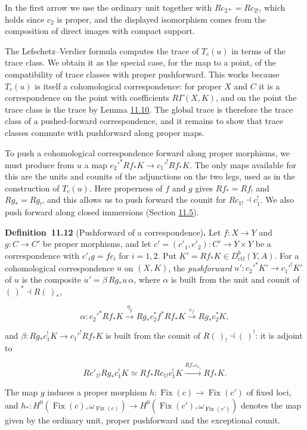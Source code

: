 \documentclass[11pt]{article}
\newenvironment{bpstatement}[2]{\par\addvspace{0.6\baselineskip}\noindent\textbf{#1}#2\textbf{.}\enspace\ignorespaces}
  {\par\addvspace{0.4\baselineskip}}
\providecommand{\Fix}{}\renewcommand{\Fix}{\operatorname{Fix}}
\begin{document}
\label{bp203}%
In the first arrow we use the ordinary unit together with \(Rc_{2*}=Rc_{2!}\), which holds since \(c_2\) is proper, and the displayed isomorphism comes from the composition of direct images with compact support.

The Lefschetz–Verdier formula computes the trace of \(T_c(u)\) in terms of the trace class. We obtain it as the special case, for the map to a point, of the compatibility of trace classes with proper pushforward. This works because \(T_c(u)\) is itself a cohomological correspondence: for proper \(X\) and \(C\) it is a correspondence on the point with coefficients \(R\Gamma(X,K)\), and on the point the trace class is the trace by Lemma \hyperref[bp199]{11.10}. The global trace is therefore the trace class of a pushed-forward correspondence, and it remains to show that trace classes commute with pushforward along proper maps.

To push a cohomological correspondence forward along proper morphisms, we must produce from \(u\) a map \(c_2'^*Rf_*K\to c_1'^!Rf_*K\). The only maps available for this are the units and counits of the adjunctions on the two legs, used as in the construction of \(T_c(u)\). Here properness of \(f\) and \(g\) gives \(Rf_*=Rf_!\) and \(Rg_*=Rg_!\), and this allows us to push forward the counit for \(Rc_{1!}\dashv c_1^!\). We also push forward along closed immersions (Section \hyperref[bp209]{11.5}).

\label{bp204}%
\begin{bpstatement}{Definition~11.12}{ (Pushforward of a correspondence)}
Let \(f:X\to Y\) and \(g:C\to C'\) be proper morphisms, and let \(c'=(c'_1,c'_2):C'\to Y\times Y\) be a correspondence with \(c'_ig=fc_i\) for \(i=1,2\). Put \(K'=Rf_*K\in D^b_{\mathrm{ctf}}(Y,A)\). For a cohomological correspondence \(u\) on \((X,K)\), the \emph{pushforward} \(u':c_2'^*K'\to c_1'^!K'\) of \(u\) is the composite \(u'=\beta\,Rg_*u\,\alpha\), where \(\alpha\) is built from the unit and counit of \((\,)^*\dashv R(\,)_*\),

\[
\alpha:c_2'^*Rf_*K\xrightarrow{\eta_g}
Rg_*c_2^*f^*Rf_*K\xrightarrow{\varepsilon_f}Rg_*c_2^*K,
\]

and \(\beta:Rg_*c_1^!K\to c_1'^!Rf_*K\) is built from the counit of \(R(\,)_!\dashv(\,)^!\): it is adjoint to

\[
Rc'_{1!}Rg_*c_1^!K\simeq Rf_*Rc_{1!}c_1^!K
\xrightarrow{Rf_*\varepsilon_{c_1}}Rf_*K.
\]

The map \(g\) induces a proper morphism \(h:\Fix(c)\to \Fix(c')\) of fixed loci, and \(h_*:H^0(\Fix(c),\omega_{\Fix(c)})\to H^0(\Fix(c'),\omega_{\Fix(c')})\) denotes the map given by the ordinary unit, proper pushforward and the exceptional counit.
\end{bpstatement}
\end{document}
